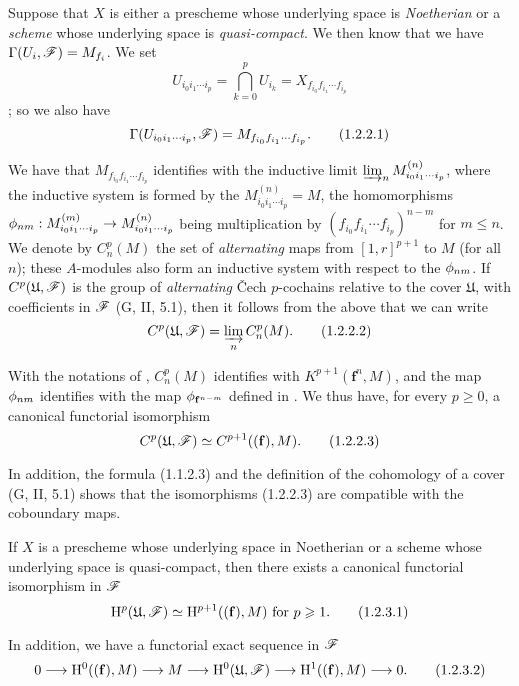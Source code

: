 \begin{env}[1.2.2]
\label{III.1.2.2}
Suppose that $X$ is either a prescheme whose underlying space is \emph{Noetherian} or a \emph{scheme} whose underlying space is \emph{quasi-compact}.
We then know  that we have $\Gamma(U_i,\mathscr{F})=M_{f_i}$.
We set
\[
  U_{i_0 i_1\cdots i_p}=\bigcap_{k=0}^p U_{i_k}=X_{f_{i_0}f_{i_1}\cdots f_{i_p}}
\]
; so we also have
\[
  \Gamma(U_{i_0 i_1\cdots i_p},\mathscr{F})=M_{f_{i_0}f_{i_1}\cdots f_{i_p}}.
  \tag{1.2.2.1}
\]

We have  that $M_{f_{i_0}f_{i_1}\cdots f_{i_p}}$ identifies with the inductive limit $\varinjlim_n M_{i_0 i_1\cdots i_p}^{(n)}$, where the inductive system is formed by the $M_{i_0 i_1\cdots i_p}^{(n)}=M$, the homomorphisms $\vphi_{nm}:M_{i_0 i_1\cdots i_p}^{(m)}\to M_{i_0 i_1\cdots i_p}^{(n)}$ being multiplication by $(f_{i_0}f_{i_1}\cdots f_{i_p})^{n-m}$ for $m\leq n$.
We denote by $C_n^p(M)$ the set of \emph{alternating} maps from $[1,r]^{p+1}$ to $M$ (for all $n$); these $A$-modules also form an inductive system with respect to the $\phi_{nm}$.
If $C^p(\mathfrak{U},\mathscr{F})$ is the group of \emph{alternating} \v Cech $p$-cochains relative to the cover $\mathfrak{U}$, with coefficients in $\mathscr{F}$ (G, II, 5.1), then it follows from the above that we can write
\[
  C^p(\mathfrak{U},\mathscr{F})=\varinjlim_n C_n^p(M).
  \tag{1.2.2.2}
\]

With the notations of , $C_n^p(M)$ identifies with $K^{p+1}(\mathbf{f}^n,M)$, and the map $\phi_{nm}$ identifies with the map $\phi_{\mathbf{f}^{n-m}}$ defined in .
We thus have, for every $p\geq 0$, a canonical functorial isomorphism
\[
  C^p(\mathfrak{U},\mathscr{F})\simeq C^{p+1}((\mathbf{f}),M).
  \tag{1.2.2.3}
\]

In addition, the formula (1.1.2.3) and the definition of the cohomology of a cover (G, II, 5.1) shows that the isomorphisms (1.2.2.3) are compatible with the coboundary maps.
\end{env}

\begin{proposition}[1.2.3]
\label{III.1.2.3}
If $X$ is a prescheme whose underlying space in Noetherian or a scheme whose underlying space is quasi-compact, then there exists a canonical functorial isomorphism in $\mathscr{F}$
\[
  \mathrm{H}^p(\mathfrak{U},\mathscr{F})\simeq\mathrm{H}^{p+1}((\mathbf{f}),M)\text{ for }p\geqslant 1.
  \tag{1.2.3.1}
\]

In addition, we have a functorial exact sequence in $\mathscr{F}$
\[
  0\to\HH^0((\mathbf{f}),M)\to M\to\HH^0(\mathfrak{U},\sh{F})\to\HH^1((\mathbf{f}),M)\to 0.
  \tag{1.2.3.2}
\]
\end{proposition}

